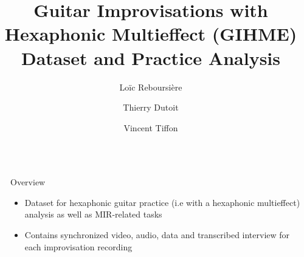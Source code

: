 \documentclass[final]{beamer}
\title{Guitar Improvisations with Hexaphonic Multieffect (GIHME) Dataset and Practice Analysis} %
\author{Loïc Reboursière%
\and
Thierry Dutoit%
\and
Vincent Tiffon}
\newlength{\sepwid}
\newlength{\onecolwid}
\begin{document}

\setlength{\belowcaptionskip}{2ex} %
\setlength\belowdisplayshortskip{2ex} %

\begin{frame}[t] %

\begin{columns}[t] %

\begin{column}{\sepwid}\end{column} %

\begin{column}{\onecolwid} %


\begin{alertblock}{Overview}



\begin{itemize}
    \item Dataset for hexaphonic guitar practice (i.e with a hexaphonic multieffect) analysis as well as MIR-related tasks
    
    \item Contains synchronized video, audio, data and transcribed interview for each improvisation recording
    

\end{itemize}
\end{alertblock}
\end{column}
\end{columns}
\end{frame}
\end{document}
